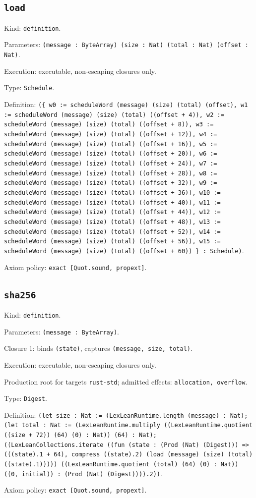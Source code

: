 \documentclass[11pt]{article}
\begin{document}
\subsection*{\texttt{load}}
\noindent Kind: \texttt{definition}.\par
\noindent Parameters: \texttt{(message : ByteArray) (size : Nat) (total : Nat) (offset : Nat)}.\par
\noindent Execution: executable, non-escaping closures only.\par
\noindent Type: \texttt{Schedule}.\par
\noindent Definition: \texttt{(\{ w0 := scheduleWord (message) (size) (total) (offset), w1 := scheduleWord (message) (size) (total) ((offset + 4)), w2 := scheduleWord (message) (size) (total) ((offset + 8)), w3 := scheduleWord (message) (size) (total) ((offset + 12)), w4 := scheduleWord (message) (size) (total) ((offset + 16)), w5 := scheduleWord (message) (size) (total) ((offset + 20)), w6 := scheduleWord (message) (size) (total) ((offset + 24)), w7 := scheduleWord (message) (size) (total) ((offset + 28)), w8 := scheduleWord (message) (size) (total) ((offset + 32)), w9 := scheduleWord (message) (size) (total) ((offset + 36)), w10 := scheduleWord (message) (size) (total) ((offset + 40)), w11 := scheduleWord (message) (size) (total) ((offset + 44)), w12 := scheduleWord (message) (size) (total) ((offset + 48)), w13 := scheduleWord (message) (size) (total) ((offset + 52)), w14 := scheduleWord (message) (size) (total) ((offset + 56)), w15 := scheduleWord (message) (size) (total) ((offset + 60)) \} : Schedule)}.\par
\noindent Axiom policy: \texttt{exact [Quot.sound, propext]}.\par
\subsection*{\texttt{sha256}}
\noindent Kind: \texttt{definition}.\par
\noindent Parameters: \texttt{(message : ByteArray)}.\par
\noindent Closure 1: binds \texttt{(state)}, captures \texttt{(message, size, total)}.\par
\noindent Execution: executable, non-escaping closures only.\par
\noindent Production root for targets \texttt{rust-std}; admitted effects: \texttt{allocation, overflow}.\par
\noindent Type: \texttt{Digest}.\par
\noindent Definition: \texttt{(let size : Nat := (LexLeanRuntime.length (message) : Nat); (let total : Nat := (LexLeanRuntime.multiply ((LexLeanRuntime.quotient ((size + 72)) (64) (0) : Nat)) (64) : Nat); ((LexLeanCollections.iterate ((fun (state : (Prod (Nat) (Digest))) => (((state).1 + 64), compress ((state).2) (load (message) (size) (total) ((state).1))))) ((LexLeanRuntime.quotient (total) (64) (0) : Nat)) ((0, initial)) : (Prod (Nat) (Digest)))).2))}.\par
\noindent Axiom policy: \texttt{exact [Quot.sound, propext]}.\par
\end{document}
